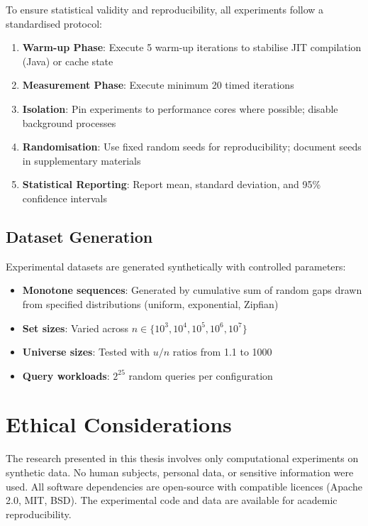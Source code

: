 To ensure statistical validity and reproducibility, all experiments follow a standardised protocol:

\begin{enumerate}
    \item \textbf{Warm-up Phase}: Execute 5 warm-up iterations to stabilise JIT compilation (Java) or cache state
    \item \textbf{Measurement Phase}: Execute minimum 20 timed iterations
    \item \textbf{Isolation}: Pin experiments to performance cores where possible; disable background processes
    \item \textbf{Randomisation}: Use fixed random seeds for reproducibility; document seeds in supplementary materials
    \item \textbf{Statistical Reporting}: Report mean, standard deviation, and 95\% confidence intervals
\end{enumerate}

\subsection{Dataset Generation}

Experimental datasets are generated synthetically with controlled parameters:

\begin{itemize}
    \item \textbf{Monotone sequences}: Generated by cumulative sum of random gaps drawn from specified distributions (uniform, exponential, Zipfian)
    \item \textbf{Set sizes}: Varied across $n \in \{10^3, 10^4, 10^5, 10^6, 10^7\}$
    \item \textbf{Universe sizes}: Tested with $u/n$ ratios from 1.1 to 1000
    \item \textbf{Query workloads}: $2^{25}$ random queries per configuration
\end{itemize}

\section{Ethical Considerations}

The research presented in this thesis involves only computational experiments on synthetic data. No human subjects, personal data, or sensitive information were used. All software dependencies are open-source with compatible licences (Apache 2.0, MIT, BSD). The experimental code and data are available for academic reproducibility.

